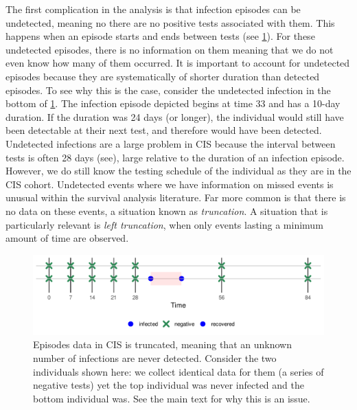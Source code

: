 \documentclass[thesis.tex]{subfiles}
\begin{document}
The first complication in the analysis is that infection episodes can be undetected, meaning no there are no positive tests associated with them.
This happens when an episode starts and ends between tests (see \cref{perf-test:fig:truncation}).
For these undetected episodes, there is no information on them meaning that we do not even know how many of them occurred.
It is important to account for undetected episodes because they are systematically of shorter duration than detected episodes.
To see why this is the case, consider the undetected infection in the bottom of \cref{perf-test:fig:truncation}.
The infection episode depicted begins at time 33 and has a 10-day duration.
If the duration was 24 days (or longer), the individual would still have been detectable at their next test, and therefore would have been detected.
Undetected infections are a large problem in CIS because the interval between tests is often 28 days (see), large relative to the duration of an infection episode.
However, we do still know the testing schedule of the individual as they are in the CIS cohort.
Undetected events where we have information on missed events is unusual within the survival analysis literature.
Far more common is that there is no data on these events, a situation known as \emph{truncation}.
A situation that is particularly relevant is \emph{left truncation}, when only events lasting a minimum amount of time are observed.
\begin{figure}
  \centering \includegraphics{cis-perfect-testing/truncation}
  \caption[Truncation in CIS data]{Episodes data in CIS is truncated, meaning that an unknown number of infections are never detected. Consider the two individuals shown here: we collect identical data for them (a series of negative tests) yet the top individual was never infected and the bottom individual was. See the main text for why this is an issue. \label{perf-test:fig:truncation}}
\end{figure}
\end{document}

